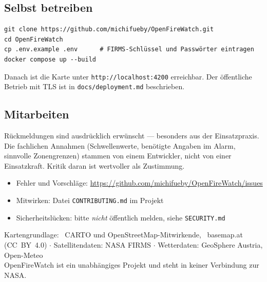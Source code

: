 \documentclass[11pt,a4paper,DIV=12,parskip=half]{scrartcl}
\begin{document}
\subsection{Selbst betreiben}

\begin{verbatim}
git clone https://github.com/michifueby/OpenFireWatch.git
cd OpenFireWatch
cp .env.example .env      # FIRMS-Schlüssel und Passwörter eintragen
docker compose up --build
\end{verbatim}

Danach ist die Karte unter \texttt{http://localhost:4200} erreichbar. Der
öffentliche Betrieb mit TLS ist in \texttt{docs/deployment.md} beschrieben.

\subsection{Mitarbeiten}

Rückmeldungen sind ausdrücklich erwünscht --- besonders aus der Einsatzpraxis.
Die fachlichen Annahmen (Schwellenwerte, benötigte Angaben im Alarm, sinnvolle
Zonengrenzen) stammen von einem Entwickler, nicht von einer Einsatzkraft.
Kritik daran ist wertvoller als Zustimmung.

\begin{itemize}[leftmargin=*, itemsep=1pt]
  \item Fehler und Vorschläge: \url{https://github.com/michifueby/OpenFireWatch/issues}
  \item Mitwirken: Datei \texttt{CONTRIBUTING.md} im Projekt
  \item Sicherheitslücken: bitte \emph{nicht} öffentlich melden, siehe
    \texttt{SECURITY.md}
\end{itemize}

\vfill
\begin{center}
\color{ofwGrau}\small
Kartengrundlage: \textcopyright\ CARTO und OpenStreetMap-Mitwirkende,
\textcopyright\ basemap.at (CC~BY~4.0) \quad$\cdot$\quad
Satellitendaten: NASA FIRMS \quad$\cdot$\quad
Wetterdaten: GeoSphere Austria, Open-Meteo\\
OpenFireWatch ist ein unabhängiges Projekt und steht in keiner Verbindung zur NASA.
\end{center}
\end{document}

